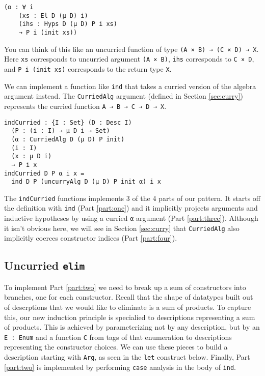 \documentclass[preprint,nonatbib]{sigplanconf}
\begin{document}
\begin{verbatim}
(α : ∀ i
    (xs : El D (μ D) i)
    (ihs : Hyps D (μ D) P i xs)
    → P i (init xs))
\end{verbatim}

You can think of this like an uncurried function of type
{\tt (A × B) → (C × D) → X}. Here {\tt xs} corresponds to uncurried
argument {\tt (A × B)}, {\tt ihs} corresponds to {\tt C × D}, and 
{\tt P i (init xs)} corresponds to the return type {\tt X}.

We can implement a function like {\tt ind} that takes a curried
version of the algebra argument instead. The {\tt CurriedAlg} argument
(defined in Section \ref{sec:curry}) represents the curried function
{\tt A → B → C → D → X}.

\begin{verbatim}
indCurried : {I : Set} (D : Desc I)
  (P : (i : I) → μ D i → Set)
  (α : CurriedAlg D (μ D) P init)
  (i : I)
  (x : μ D i)
  → P i x
indCurried D P α i x =
  ind D P (uncurryAlg D (μ D) P init α) i x
\end{verbatim}

The {\tt indCurried} functions implements 3 of the 4 parts of our
pattern. It starts off the definition with {\tt ind}
(Part \ref{part:one}) and it implicitly projects arguments and inductive
hypotheses by using a curried {\tt α} argument
(Part \ref{part:three}). Although it isn't obvious here, we will see
in Section \ref{sec:curry} that {\tt CurriedAlg} also implicitly
coerces constructor indices (Part \ref{part:four}).

\subsection{Uncurried {\tt elim}}

To implement Part \ref{part:two} we need to break up a sum of
constructors into branches, one for each constructor. Recall that the
shape of datatypes built out of descrptions that we would like to
eliminate is a sum of products. To capture this, our new induction
principle is specialied to descriptions representing a sum of
products. This is achieved by parameterizing not by any description,
but by an {\tt E : Enum} and a function {\tt C} from tags of that enumeration to
descriptions representing the constructor choices. We can use these
pieces to build a description starting with {\tt Arg}, as seen in the
{\tt let} construct below. Finally, Part \ref{part:two} is implemented
by performing {\tt case} analysis in the body of {\tt ind}.
\end{document}
